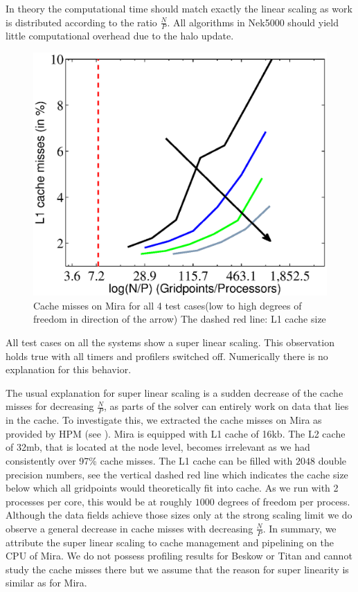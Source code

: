 \documentclass{sig-alternate}
\begin{document}
In theory the computational time should match exactly the linear scaling
as work is distributed according to the ratio $\frac{N}{P}$. All
algorithms in Nek5000 should yield little computational overhead due to the halo update.

\begin{figure}
  \centering
  \includegraphics[width=\linewidth]{./figures/cachearrow.eps}
  \caption{Cache misses on Mira for all 4 test cases(low to high degrees of freedom in direction of the arrow) The dashed red line: L1 cache size}
   \label{fig:cachemisses}
\end{figure}

All test cases on all the systems show a super linear scaling. This
observation holds true with all timers and profilers switched off.
Numerically there is no explanation for this behavior. 

The usual explanation for super linear scaling is a sudden decrease of the cache
misses for decreasing $\frac{N}{P}$, as parts of the solver can entirely work on data that lies in the cache. 
To investigate this, we extracted the cache misses on Mira as provided by HPM (see
). Mira is equipped with L1 cache of 16kb. The L2 cache
of 32mb, that is located at the node level, becomes irrelevant as we had consistently
over 97\% cache misses. The L1 cache can be filled with $2048$ double precision
numbers, see
 the vertical dashed red line which indicates the cache 
size below which all gridpoints would theoretically fit into cache. As we run with 2 processes per core, this would be at roughly $1000$
degrees of freedom per process. Although the data fields achieve those sizes only at the strong scaling
limit we do observe a general decrease in cache misses with decreasing
$\frac{N}{P}$. In summary, we attribute the super linear scaling to cache
management and pipelining on the CPU of Mira. We do not possess profiling results 
for Beskow or Titan and cannot study the cache misses there but we assume that the 
reason for super linearity is similar as for Mira.
\end{document}

